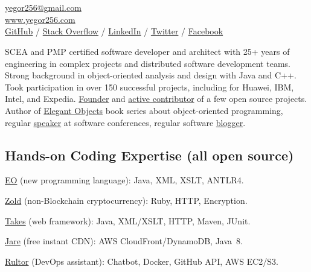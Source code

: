 \documentclass{yb}
\begin{document}
\ybPrintPhoto{}

\section*{\Large {}}

\href{mailto:yegor256@gmail.com}{yegor256@gmail.com}\\%
\href{https://www.yegor256.com}{www.yegor256.com}\\%
\href{https://github.com/yegor256}{GitHub} /
\href{https://stackexchange.com/users/63162/yegor256}{Stack Overflow} /
\href{https://www.linkedin.com/in/yegor256}{LinkedIn} /
\href{https://twitter.com/intent/follow?screen_name=yegor256}{Twitter} /
\href{https://www.facebook.com/yegor256}{Facebook}

\vspace*{12pt}

SCEA and PMP certified software developer and architect with
25+ years of engineering in complex projects and distributed software
development teams. Strong background in object-oriented analysis and design
with Java and C++. Took participation in over 150 successful projects,
including for Huawei, IBM, Intel, and Expedia. \href{https://www.yegor256.com/pets.html}{Founder}
and \href{https://github.com/yegor256}{active contributor} of
a few open source projects. Author of
\href{https://www.yegor256.com/elegant-objects.html}{Elegant Objects}
book series about object-oriented programming,
regular \href{https://www.yegor256.com/talks.html}{speaker} at software conferences, regular software
\href{https://www.yegor256.com}{blogger}.

\subsection*{Hands-on Coding Expertise (all open source)}

\href{https://www.eolang.org}{EO} (new programming language):
Java, XML, XSLT, ANTLR4.

\href{https://www.zold.io}{Zold} (non-Blockchain cryptocurrency):
Ruby, HTTP, Encryption.

\href{https://www.takes.org}{Takes} (web framework):
Java, XML/XSLT, HTTP, Maven, JUnit.

\href{https://www.jare.io}{Jare} (free instant CDN):
AWS CloudFront/DynamoDB, Java~8.

\href{https://www.rultor.com}{Rultor} (DevOps assistant):
Chatbot, Docker, GitHub API, AWS EC2/S3.
\end{document}
